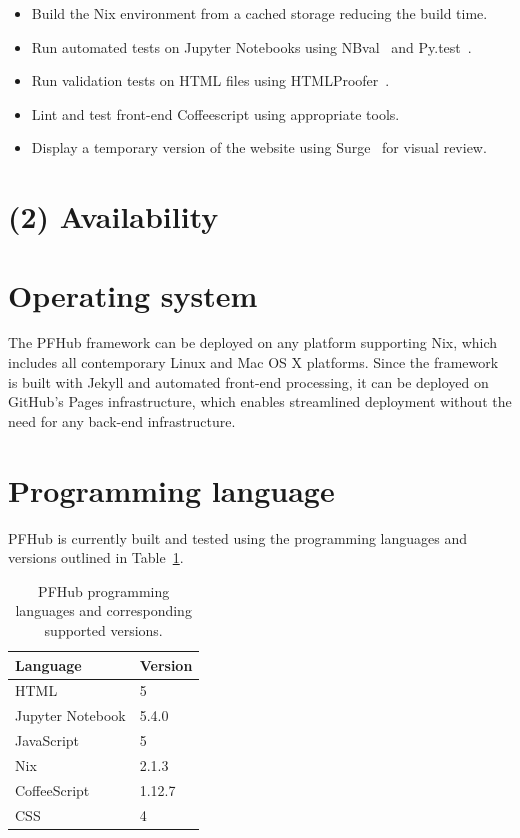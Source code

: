 \documentclass{jors}
\begin{document}
\begin{itemize}
  \item Build the Nix environment from a cached storage reducing the
    build time.
  \item Run automated tests on Jupyter Notebooks using
    NBval~\cite{nbval} and Py.test~\cite{pytest}.
  \item Run validation tests on HTML files using
    HTMLProofer~\cite{htmlproofer}.
  \item Lint and test front-end Coffeescript using appropriate tools.
  \item Display a temporary version of the website using
    Surge~\cite{surge} for visual review.
\end{itemize}

\section*{(2) Availability}
\vspace{0.5cm}
\section*{Operating system}

The PFHub framework can be deployed on any platform supporting Nix,
which includes all contemporary Linux and Mac OS X platforms. Since
the framework is built with Jekyll and automated front-end processing,
it can be deployed on GitHub's Pages infrastructure, which enables
streamlined deployment without the need for any back-end
infrastructure.

\section*{Programming language}

PFHub is currently built and tested using the programming languages
and versions outlined in Table~\ref{tab:versions}.

\begin{table}[h!]
  \centering
  \caption{PFHub programming languages and corresponding supported
    versions.}
  \begin{tabular}{|l|l|}
    \hline
    Language         & Version \\
    \hline
    HTML             & 5       \\
    Jupyter Notebook & 5.4.0   \\
    JavaScript       & 5       \\
    Nix              & 2.1.3   \\
    CoffeeScript     & 1.12.7  \\
    CSS              & 4       \\
    \hline
  \end{tabular}
  \label{tab:versions}
\end{table}
\end{document}
